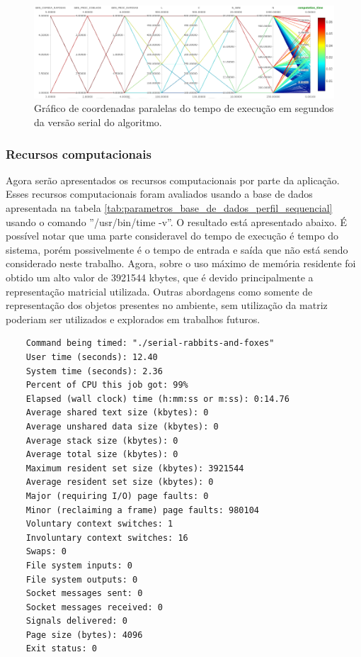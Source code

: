 \documentclass[12pt]{article}
\begin{document}
\begin{figure}[H]
	\begin{center}
		\includegraphics[width=1.0\linewidth]{./parallel_coordinates.png}
	\end{center}
	\caption{Gráfico de coordenadas paralelas do tempo de execução em segundos da versão serial do algoritmo.}
	\label{fig:parallel_coordinates}
\end{figure}


\subsubsection{Recursos computacionais}

Agora serão apresentados os recursos computacionais por parte da aplicação. Esses recursos computacionais foram avaliados usando a base de dados apresentada na tabela \ref{tab:parametros_base_de_dados_perfil_sequencial} usando o comando ''/usr/bin/time -v''. O resultado está apresentado abaixo. É possível notar que uma parte consideravel do tempo de execução é tempo do sistema, porém possivelmente é o tempo de entrada e saída que não está sendo considerado neste trabalho. Agora, sobre o uso máximo de memória residente foi obtido um alto valor de 3921544 kbytes, que é devido principalmente a representação matricial utilizada. Outras abordagens como somente de representação dos objetos presentes no ambiente, sem utilização da matriz poderiam ser utilizados e explorados em trabalhos futuros.


	{
		\scriptsize
		\begin{verbatim}
	Command being timed: "./serial-rabbits-and-foxes"
	User time (seconds): 12.40
	System time (seconds): 2.36
	Percent of CPU this job got: 99%
	Elapsed (wall clock) time (h:mm:ss or m:ss): 0:14.76
	Average shared text size (kbytes): 0
	Average unshared data size (kbytes): 0
	Average stack size (kbytes): 0
	Average total size (kbytes): 0
	Maximum resident set size (kbytes): 3921544
	Average resident set size (kbytes): 0
	Major (requiring I/O) page faults: 0
	Minor (reclaiming a frame) page faults: 980104
	Voluntary context switches: 1
	Involuntary context switches: 16
	Swaps: 0
	File system inputs: 0
	File system outputs: 0
	Socket messages sent: 0
	Socket messages received: 0
	Signals delivered: 0
	Page size (bytes): 4096
	Exit status: 0
\end{verbatim}
	}
\end{document}
